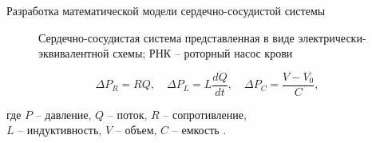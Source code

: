 \documentclass[a4paper, 9pt]{beamer}
\begin{document}

\begin{frame}{Разработка математической модели сердечно-сосудистой системы}	

\begin{minipage}[ht]{0.46\textwidth}
\scriptsize


\begin{figure}
\vskip-1pt
\caption{\scriptsize Сердечно-сосудистая система представленная в виде электрически-\\эквивалентной схемы; \tiny РНК -- роторный насос крови}
\end{figure}

\vskip-18pt
\begin{equation*}
	\Delta P_R = RQ,\quad \Delta P_L = L\frac{dQ}{dt},\quad \Delta P_C = \frac{V-V_0}{C},
\end{equation*}
\vskip-2pt

где $P$ -- давление, $Q$ -- поток, $R$ -- сопротивление, \\$L$ -- индуктивность, $V$ -- объем, $C$ -- емкость \footnotemark[1].

\end{minipage}
\hfill
\begin{minipage}[ht]{0.51\textwidth}
\scriptsize


\end{minipage}
\end{frame}
\end{document}
